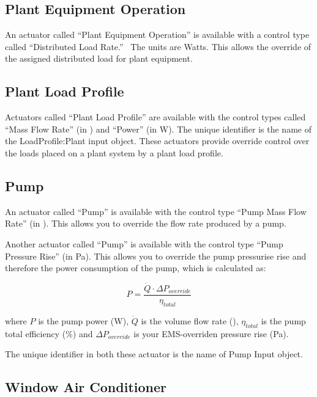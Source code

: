 \subsection{Plant Equipment Operation}\label{plant-equipment-operation}

An actuator called ``Plant Equipment Operation'' is available with a control type called ``Distributed Load Rate.''~ The units are Watts.  This allows the override of the assigned distributed load for plant equipment.

\subsection{Plant Load Profile}\label{plant-load-profile}

Actuators called ``Plant Load Profile'' are available with the control types called ``Mass Flow Rate'' (in \si{\massFlowRate}) and ``Power'' (in W). The unique identifier is the name of the LoadProfile:Plant input object. These actuators provide override control over the loads placed on a plant system by a plant load profile.

\subsection{Pump}\label{pump}

An actuator called ``Pump'' is available with the control type ``Pump Mass Flow Rate'' (in \si{\massFlowRate}). This allows you to override the flow rate produced by a pump.

Another actuator called ``Pump'' is available with the control type ``Pump Pressure Rise'' (in \si{\pascal}). This allows you to override the pump pressurise rise and therefore the power consumption of the pump, which is calculated as:

\begin{equation}
    P = \frac{\dot{Q} \cdot \Delta P_{override}}{\eta_{total}}
\end{equation}

where $P$ is the pump power (\si{\watt}), $\dot{Q}$ is the volume flow rate (\si{\volumeFlowRate}), $\eta_{total}$ is the pump total efficiency (\%)
and $\Delta P_{override}$ is your EMS-overriden pressure rise (\si{\pascal}).

The unique identifier in both these actuator is the name of Pump Input object.

\subsection{Window Air Conditioner}\label{window-air-conditioner}

